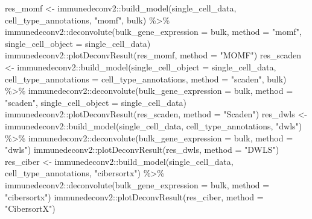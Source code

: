 \documentclass[
]{article}
\newenvironment{Shaded}{\begin{snugshade}}{\end{snugshade}}
\newcommand{\AttributeTok}[1]{\textcolor[rgb]{0.77,0.63,0.00}{#1}}
\newcommand{\FunctionTok}[1]{\textcolor[rgb]{0.00,0.00,0.00}{#1}}
\newcommand{\NormalTok}[1]{#1}
\newcommand{\OtherTok}[1]{\textcolor[rgb]{0.56,0.35,0.01}{#1}}
\newcommand{\SpecialCharTok}[1]{\textcolor[rgb]{0.00,0.00,0.00}{#1}}
\newcommand{\StringTok}[1]{\textcolor[rgb]{0.31,0.60,0.02}{#1}}
\begin{document}
\begin{Shaded}
\begin{Highlighting}[]
\NormalTok{res\_momf }\OtherTok{\textless{}{-}}\NormalTok{ immunedeconv2}\SpecialCharTok{::}\FunctionTok{build\_model}\NormalTok{(single\_cell\_data, cell\_type\_annotations, }
    \StringTok{"momf"}\NormalTok{, bulk) }\SpecialCharTok{\%\textgreater{}\%}\NormalTok{ immunedeconv2}\SpecialCharTok{::}\FunctionTok{deconvolute}\NormalTok{(}\AttributeTok{bulk\_gene\_expression =}\NormalTok{ bulk, }
    \AttributeTok{method =} \StringTok{"momf"}\NormalTok{, }\AttributeTok{single\_cell\_object =}\NormalTok{ single\_cell\_data)}
\NormalTok{immunedeconv2}\SpecialCharTok{::}\FunctionTok{plotDeconvResult}\NormalTok{(res\_momf, }\AttributeTok{method =} \StringTok{"MOMF"}\NormalTok{)}
\NormalTok{res\_scaden }\OtherTok{\textless{}{-}}\NormalTok{ immunedeconv2}\SpecialCharTok{::}\FunctionTok{build\_model}\NormalTok{(}\AttributeTok{single\_cell\_object =}\NormalTok{ single\_cell\_data, }
    \AttributeTok{cell\_type\_annotations =}\NormalTok{ cell\_type\_annotations, }\AttributeTok{method =} \StringTok{"scaden"}\NormalTok{, }
\NormalTok{    bulk) }\SpecialCharTok{\%\textgreater{}\%}\NormalTok{ immunedeconv2}\SpecialCharTok{::}\FunctionTok{deconvolute}\NormalTok{(}\AttributeTok{bulk\_gene\_expression =}\NormalTok{ bulk, }
    \AttributeTok{method =} \StringTok{"scaden"}\NormalTok{, }\AttributeTok{single\_cell\_object =}\NormalTok{ single\_cell\_data)}
\NormalTok{immunedeconv2}\SpecialCharTok{::}\FunctionTok{plotDeconvResult}\NormalTok{(res\_scaden, }\AttributeTok{method =} \StringTok{"Scaden"}\NormalTok{)}
\NormalTok{res\_dwls }\OtherTok{\textless{}{-}}\NormalTok{ immunedeconv2}\SpecialCharTok{::}\FunctionTok{build\_model}\NormalTok{(single\_cell\_data, cell\_type\_annotations, }
    \StringTok{"dwls"}\NormalTok{) }\SpecialCharTok{\%\textgreater{}\%}\NormalTok{ immunedeconv2}\SpecialCharTok{::}\FunctionTok{deconvolute}\NormalTok{(}\AttributeTok{bulk\_gene\_expression =}\NormalTok{ bulk, }
    \AttributeTok{method =} \StringTok{"dwls"}\NormalTok{)}
\NormalTok{immunedeconv2}\SpecialCharTok{::}\FunctionTok{plotDeconvResult}\NormalTok{(res\_dwls, }\AttributeTok{method =} \StringTok{"DWLS"}\NormalTok{)}
\NormalTok{res\_ciber }\OtherTok{\textless{}{-}}\NormalTok{ immunedeconv2}\SpecialCharTok{::}\FunctionTok{build\_model}\NormalTok{(single\_cell\_data, cell\_type\_annotations, }
    \StringTok{"cibersortx"}\NormalTok{) }\SpecialCharTok{\%\textgreater{}\%}\NormalTok{ immunedeconv2}\SpecialCharTok{::}\FunctionTok{deconvolute}\NormalTok{(}\AttributeTok{bulk\_gene\_expression =}\NormalTok{ bulk, }
    \AttributeTok{method =} \StringTok{"cibersortx"}\NormalTok{)}
\NormalTok{immunedeconv2}\SpecialCharTok{::}\FunctionTok{plotDeconvResult}\NormalTok{(res\_ciber, }\AttributeTok{method =} \StringTok{"CibersortX"}\NormalTok{)}
\end{Highlighting}
\end{Shaded}
\end{document}
